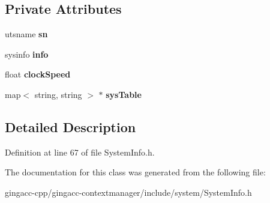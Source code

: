 \subsection*{Private Attributes}
\begin{CompactItemize}
\item 
utsname {\bf sn}\label{classbr_1_1pucrio_1_1telemidia_1_1ginga_1_1core_1_1contextmanager_1_1SystemInfo_9b402aad1b8c08bb3a3421b128c63cf8}

\item 
sysinfo {\bf info}\label{classbr_1_1pucrio_1_1telemidia_1_1ginga_1_1core_1_1contextmanager_1_1SystemInfo_1c6b3fa2f7897150767f8544aebb40a9}

\item 
float {\bf clockSpeed}\label{classbr_1_1pucrio_1_1telemidia_1_1ginga_1_1core_1_1contextmanager_1_1SystemInfo_d0b1853d20a12e61a5c3ec3d7becb64d}

\item 
map$<$ string, string $>$ $\ast$ {\bf sysTable}\label{classbr_1_1pucrio_1_1telemidia_1_1ginga_1_1core_1_1contextmanager_1_1SystemInfo_aeb2270907b828eeabb99902e35a1403}

\end{CompactItemize}


\subsection{Detailed Description}




Definition at line 67 of file SystemInfo.h.

The documentation for this class was generated from the following file:\begin{CompactItemize}
\item 
gingacc-cpp/gingacc-contextmanager/include/system/SystemInfo.h\end{CompactItemize}
